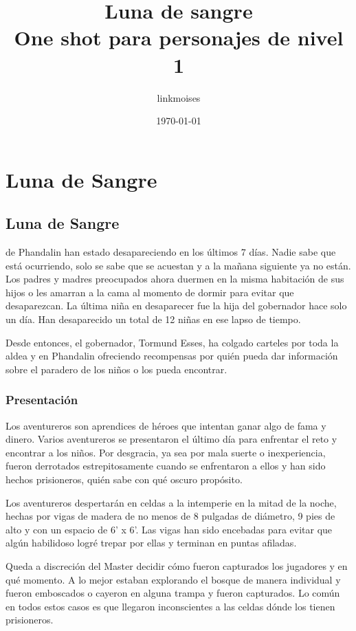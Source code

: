\documentclass[10pt,twoside,twocolumn,openany]{dndbook}
\title{Luna de sangre\\
\large One shot para personajes de nivel 1}
\author{linkmoises}
\date{\today}
\begin{document}
\frontmatter

\maketitle

\mainmatter

\part*{Luna de Sangre}

\chapter*{Luna de Sangre}

 de Phandalin han estado desapareciendo en los últimos 7 días. Nadie sabe que está ocurriendo, solo se sabe que se acuestan y a la mañana siguiente ya no están. Los padres y madres preocupados ahora duermen en la misma habitación de sus hijos o les amarran a la cama al momento de dormir para evitar que desaparezcan. La última niña en desaparecer fue la hija del gobernador hace solo un día. Han desaparecido un total de 12 niñas en ese lapso de tiempo.

Desde entonces, el gobernador, Tormund Esses, ha colgado carteles por toda la aldea y en Phandalin ofreciendo recompensas por quién pueda dar información sobre el paradero de los niños o los pueda encontrar.

\section{Presentación}

Los aventureros son aprendices de héroes que intentan ganar algo de fama y dinero. Varios aventureros se presentaron el último día para enfrentar el reto y encontrar a los niños. Por desgracia, ya sea por mala suerte o inexperiencia, fueron derrotados estrepitosamente cuando se enfrentaron a ellos y han sido hechos prisioneros, quién sabe con qué oscuro propósito.

Los aventureros despertarán en celdas a la intemperie en la mitad de la noche, hechas por vigas de madera de no menos de 8 pulgadas de diámetro, 9 pies de alto y con un espacio de 6' x 6'. Las vigas han sido encebadas para evitar que algún habilidoso logré trepar por ellas y terminan en puntas afiladas.

Queda a discreción del Master decidir cómo fueron capturados los jugadores y en qué momento. A lo mejor estaban explorando el bosque de manera individual y fueron emboscados o cayeron en alguna trampa y fueron capturados. Lo común en todos estos casos es que llegaron inconscientes a las celdas dónde los tienen prisioneros.
\end{document}
